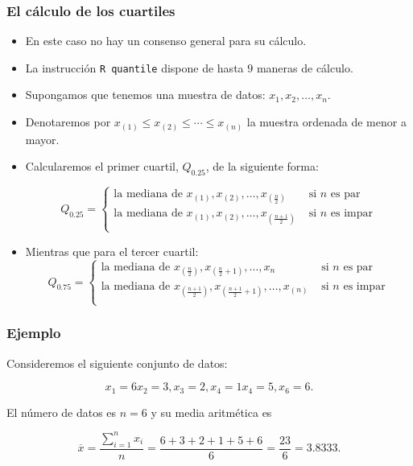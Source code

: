 \begin{frame}
\frametitle{El cálculo de los cuartiles}
\begin{itemize}
\item En este caso no hay un consenso general para su cálculo.
\item La instrucción \texttt{R quantile} dispone de hasta $9$ maneras de cálculo.
\item Supongamos que tenemos una muestra de datos: $x_1,x_2,\ldots, x_n$.
\item Denotaremos por $x_{(1)}\leq x_{(2)}\leq \cdots \leq x_{(n)}$ la muestra ordenada de menor a mayor.
\item Calcularemos el primer cuartil, $Q_{0.25}$, de la siguiente forma:

$$Q_{0.25}=\left\{\begin{array}{ll}
\mbox{la mediana de } x_{(1)},x_{(2)},\ldots,x_{(\frac{n}{2})} & \mbox{ si } n \mbox{ es par}\\
\mbox{la mediana de } x_{(1)},x_{(2)},\ldots,x_{(\frac{n+1}{2})} & \mbox{ si } n \mbox{ es impar}\\
\end{array}\right.
$$

\item Mientras que para el tercer cuartil:
$$Q_{0.75}=\left\{\begin{array}{ll}
\mbox{la mediana de } x_{(\frac{n}{2})},x_{(\frac{n}{2}+1)},\ldots,x_{n} & \mbox{ si } n \mbox{ es par}\\
\mbox{la mediana de } x_{(\frac{n+1}{2})},x_{(\frac{n+1}{2}+1)},\ldots,x_{(n)} & \mbox{ si } n \mbox{ es impar}\\
\end{array}\right.
$$
\end{itemize}
\end{frame}


\begin{frame}
\frametitle{Ejemplo}

Consideremos el siguiente conjunto de datos:

$$x_1=6 x_2=3, x_3=2, x_4= 1 x_4=5,x_6=6.$$

El número de datos es $n=6$ y su media aritmética es 

$$\overline{x}=\frac{\sum_{i=1}^n x_i}{n}=\frac{6+3+2+1+5+6}{6}=\frac{23}{6}=3.8333.$$

\end{frame}

